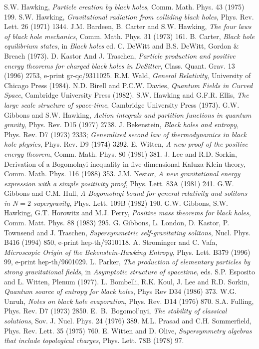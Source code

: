 \documentclass[12pt]{article}
\begin{document}
\vfill\eject
\begin{thebibliography}{99}
S.W. Hawking, {\it Particle creation by black holes},
Comm. Math. Phys.
43 (1975) 199.
S.W. Hawking, {\it Gravitational radiation from colliding
black holes},
Phys. Rev. Lett. 26 (1971) 1344.
J.M. Bardeen, B. Carter and S.W. Hawking, {\it The four laws
of black hole
mechanics}, Comm. Math. Phys. 31 (1973) 161.
B. Carter, {\it Black hole equilibrium states}, in {\it
Black holes} ed. C. DeWitt and B.S.
DeWitt, Gordon \& Breach (1973).
D. Kastor And J. Traschen, {\it Particle production and
positive
energy theorems for charged black holes in DeSitter}, Class. Quant. Grav.
13 (1996) 2753, e-print gr-qc/9311025.
R.M. Wald, {\it General Relativity}, University of Chicago
Press (1984).
N.D. Birell and P.C.W. Davies, {\it Quantum Fields in Curved
Space},
Cambridge University Press (1982).
S.W. Hawking and G.F.R. Ellis, {\it The large scale structure
of space-time}, Cambridge University
Press (1973).
G.W. Gibbons and S.W. Hawking, {\it Action integrals and
partition functions in quantum gravity},
Phys. Rev. D15 (1977) 2738.
J. Bekenstein, {\it Black holes and entropy}, Phys. Rev. D7
(1973) 2333;
{\it Generalized second law of thermodynamics in black hole physics},
Phys. Rev. D9 (1974) 3292.
E. Witten, {\it A new proof of the positive energy theorem}, Comm. Math. Phys.
80 (1981) 381.
J. Lee and R.D. Sorkin, {Derivation of a Bogomolnyi
inequality in five-dimensional Kaluza-Klein
theory}, Comm. Math. Phys. 116 (1988) 353.
J.M. Nestor, {\it A new gravitational energy expression
with a simple positivity proof}, Phys. Lett. 83A (1981) 241.
G.W. Gibbons and C.M. Hull, {\it A Bogomolnyi bound for
general relativity and solitons in
$N=2$ supergravity}, Phys. Lett. 109B (1982) 190.
G.W. Gibbons, S.W. Hawking, G.T. Horowitz and M.J. Perry,
{\it Positive mass
theorems for black holes}, Comm. Matt. Phys. 88 (1983) 295.
G. Gibbons, L. London, D.
Kastor, P. Townsend and J. Traschen, {\it Supersymmetric self-gravitating
solitons}, Nucl. Phys.
B416 (1994) 850, e-print hep-th/9310118.
A. Strominger and C. Vafa,
{\it Microscopic Origin of the Bekenstein-Hawking Entropy}, Phys. Lett.
B379 (1996) 99, e-print hep-th/9601029.
 L. Parker, {\it The production of elementary particles by
strong gravitational fields},
in {\it Asymptotic structure of spacetime}, eds. S.P. Esposito and L.
Witten, Plenum (1977).
L. Bombelli, R.K. Koul, J. Lee and R.D. Sorkin, {\it
Quantum source of entropy for black holes},
Phys Rev D34 (1986) 373.
W.G. Unruh, {\it Notes on black hole evaporation}, Phys.
Rev. D14 (1976) 870.
S.A. Fulling, Phys. Rev. D7 (1973) 2850.
E.~B.~Bogomol'nyi, {\it The stability of classical
solutions}, Sov. J. Nucl. Phys. 24 (1976)
389.
 M.L. Prasad and C.H. Sommerfield, Phys. Rev. Lett. 35
(1975) 760.
 E. Witten and D. Olive, {\it Supersymmetry algebras that
include topological charges},
Phys. Lett. 78B (1978) 97.
\end{thebibliography}
\end{document}
